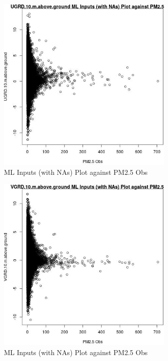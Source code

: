 \begin{figure} 
\centering  
\includegraphics[width=0.77\textwidth]{Code_Outputs/Report_ML_input_PM25_Step4_part_e_de_duplicated_aves_compiled_2019-05-14wNAs_UGRD10mabovegroundvPM25_Obs.jpg} 
\caption{\label{fig:Report_ML_input_PM25_Step4_part_e_de_duplicated_aves_compiled_2019-05-14wNAsUGRD10mabovegroundvPM25_Obs}ML Inputs (with NAs) Plot against PM2.5 Obs} 
\end{figure} 
 

\begin{figure} 
\centering  
\includegraphics[width=0.77\textwidth]{Code_Outputs/Report_ML_input_PM25_Step4_part_e_de_duplicated_aves_compiled_2019-05-14wNAs_VGRD10mabovegroundvPM25_Obs.jpg} 
\caption{\label{fig:Report_ML_input_PM25_Step4_part_e_de_duplicated_aves_compiled_2019-05-14wNAsVGRD10mabovegroundvPM25_Obs}ML Inputs (with NAs) Plot against PM2.5 Obs} 
\end{figure} 
 

